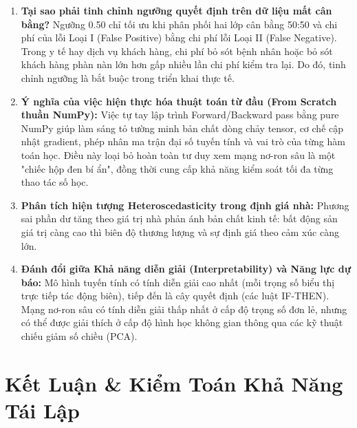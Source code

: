 \documentclass[12pt,a4paper]{report}
\begin{document}
\begin{enumerate}[label=\textbf{\arabic*.}]
    \item \textbf{Tại sao phải tinh chỉnh ngưỡng quyết định trên dữ liệu mất cân bằng?}
    Ngưỡng 0.50 chỉ tối ưu khi phân phối hai lớp cân bằng 50:50 và chi phí của lỗi Loại I (False Positive) bằng chi phí lỗi Loại II (False Negative). Trong y tế hay dịch vụ khách hàng, chi phí bỏ sót bệnh nhân hoặc bỏ sót khách hàng phàn nàn lớn hơn gấp nhiều lần chi phí kiểm tra lại. Do đó, tinh chỉnh ngưỡng là bắt buộc trong triển khai thực tế.

    \item \textbf{Ý nghĩa của việc hiện thực hóa thuật toán từ đầu (From Scratch thuần NumPy):}
    Việc tự tay lập trình Forward/Backward pass bằng pure NumPy giúp làm sáng tỏ tường minh bản chất dòng chảy tensor, cơ chế cập nhật gradient, phép nhân ma trận đại số tuyến tính và vai trò của từng hàm toán học. Điều này loại bỏ hoàn toàn tư duy xem mạng nơ-ron sâu là một "chiếc hộp đen bí ẩn", đồng thời cung cấp khả năng kiểm soát tối đa từng thao tác số học.

    \item \textbf{Phân tích hiện tượng Heteroscedasticity trong định giá nhà:}
    Phương sai phần dư tăng theo giá trị nhà phản ánh bản chất kinh tế: bất động sản giá trị càng cao thì biên độ thương lượng và sự định giá theo cảm xúc càng lớn.

    \item \textbf{Đánh đổi giữa Khả năng diễn giải (Interpretability) và Năng lực dự báo:}
    Mô hình tuyến tính có tính diễn giải cao nhất (mỗi trọng số biểu thị trực tiếp tác động biên), tiếp đến là cây quyết định (các luật IF-THEN). Mạng nơ-ron sâu có tính diễn giải thấp nhất ở cấp độ trọng số đơn lẻ, nhưng có thể được giải thích ở cấp độ hình học không gian thông qua các kỹ thuật chiếu giảm số chiều (PCA).
\end{enumerate}

\chapter{Kết Luận \& Kiểm Toán Khả Năng Tái Lập}
\end{document}
